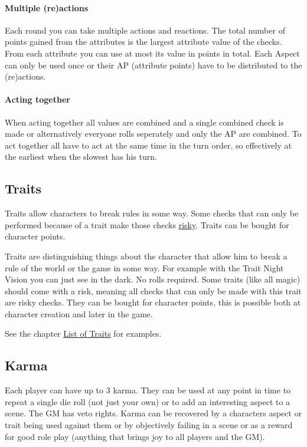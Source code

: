 \documentclass[11pt]{article}
\begin{document}
{\paragraph*{Multiple (re)actions}
\label{sec:org7d0d911}
Each round you can take multiple actions and reactions. The total number of points gained from the attributes is the largest attribute value of the checks. From each attribute you can use at most its value in points in total. Each Aspect can only be used once or their AP (attribute points) have to be distributed to the (re)actions.

\paragraph*{Acting together}
\label{sec:orgff0c247}
When acting together all values are combined and a single combined check is made or alternatively everyone rolls seperately and only the AP are combined. To act together all have to act at the same time in the turn order, so effectively at the earliest when the slowest has his turn.

\subsection{Traits}
\label{sec:orga73475e}
\begin{short}
Traits allow characters to break rules in some way. Some checks that can only be performed because of a trait make those checks \hyperref[sec:orgb8181f9]{risky}. Traits can be bought for character points.
\end{short}

Traits are distinguishing things about the character that allow him to break a rule of the world or the game in some way. For example with the Trait Night Vision you can just see in the dark. No rolls required. Some traits (like all magic) should come with a risk, meaning all checks that can only be made with this trait are risky checks. They can be bought for character points, this is possible both at character creation and later in the game.

See the chapter \hyperref[sec:orgf7e3540]{List of Traits} for examples.

\subsection{Karma}
\label{sec:org4e619c0}
\begin{short}
Each player can have up to 3 karma. They can be used at any point in time to repeat a single die roll (not just your own) or to add an interesting aspect to a scene. The GM has veto rights. Karma can be recovered by a characters aspect or trait being used against them or by objectively failing in a scene or as a reward for good role play (anything that brings joy to all players and the GM). 
\end{short}


}
\end{document}

